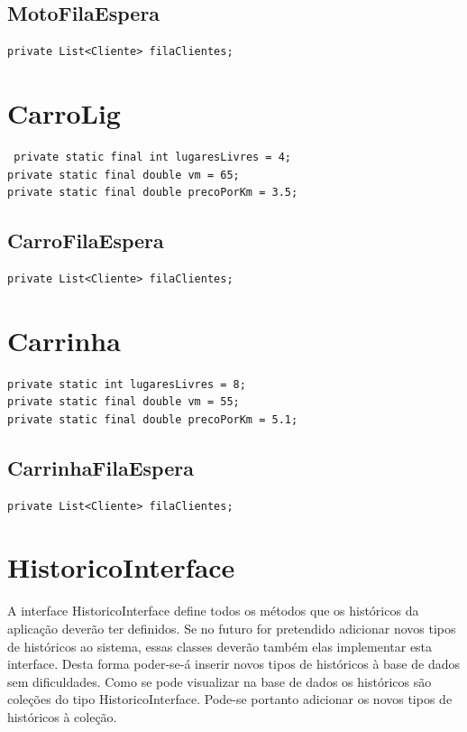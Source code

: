 \subsection{MotoFilaEspera}
\begin{verbatim}
private List<Cliente> filaClientes;
\end{verbatim}

\section{CarroLig}

\begin{verbatim}
 private static final int lugaresLivres = 4;
private static final double vm = 65; 
private static final double precoPorKm = 3.5;
\end{verbatim}

\subsection{CarroFilaEspera}
\begin{verbatim}
private List<Cliente> filaClientes;
\end{verbatim}

\section{Carrinha}

\begin{verbatim}
private static int lugaresLivres = 8;
private static final double vm = 55;
private static final double precoPorKm = 5.1;
\end{verbatim}

\subsection{CarrinhaFilaEspera}
\begin{verbatim}
private List<Cliente> filaClientes;
\end{verbatim}

\newpage
\section{HistoricoInterface}
A interface HistoricoInterface define todos os métodos que os históricos da aplicação deverão ter definidos. 
Se no futuro for pretendido adicionar novos tipos de históricos ao sistema, essas classes deverão também elas implementar esta interface.  Desta forma poder-se-á inserir novos tipos de históricos à base de dados sem dificuldades. Como se pode visualizar na base de dados os históricos são coleções do tipo HistoricoInterface. Pode-se portanto adicionar os novos tipos de históricos à coleção. 

